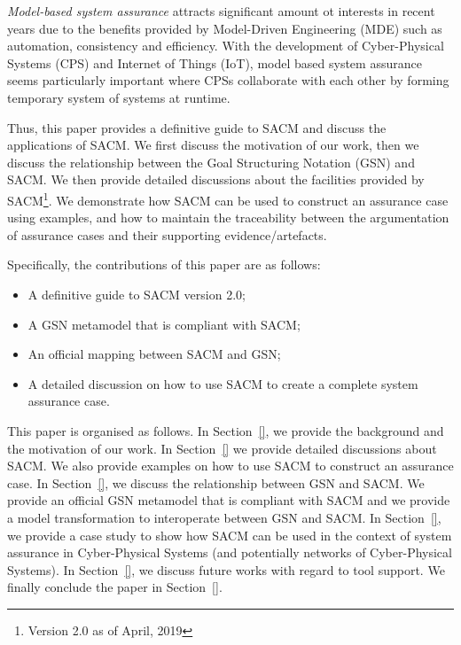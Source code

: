 \textit{Model-based system assurance} attracts significant amount ot interests in recent years due to the benefits provided by Model-Driven Engineering (MDE) such as automation, consistency and efficiency. With the development of Cyber-Physical Systems (CPS) and Internet of Things (IoT), model based system assurance seems particularly important where CPSs collaborate with each other by forming temporary system of systems at runtime.


Thus, this paper provides a definitive guide to SACM and discuss the applications of SACM. We first discuss the motivation of our work, then we discuss the relationship between the Goal Structuring Notation (GSN) and SACM. We then provide detailed discussions about the facilities provided by SACM\footnote{Version 2.0 as of April, 2019}. We demonstrate how SACM can be used to construct an assurance case using examples, and how to maintain the traceability between the argumentation of assurance cases and their supporting evidence/artefacts.

Specifically, the contributions of this paper are as follows:
\begin{itemize}
	\item A definitive guide to SACM version 2.0;
	\item A GSN metamodel that is compliant with SACM;
	\item An official mapping between SACM and GSN;
	\item A detailed discussion on how to use SACM to create a complete system assurance case.
\end{itemize}

This paper is organised as follows. In Section~\ref{}, we provide the background and the motivation of our work. In Section~\ref{} we provide detailed discussions about SACM. We also provide examples on how to use SACM to construct an assurance case. In Section~\ref{}, we discuss the relationship between GSN and SACM. We provide an official GSN metamodel that is compliant with SACM and we provide a model transformation to interoperate between GSN and SACM. In Section~\ref{}, we provide a case study to show how SACM can be used in the context of system assurance in Cyber-Physical Systems (and potentially networks of Cyber-Physical Systems). In Section~\ref{}, we discuss future works with regard to tool support. We finally conclude the paper in Section~\ref{}.

